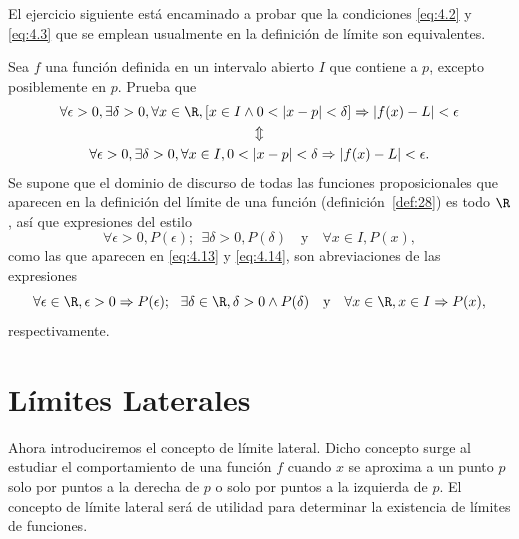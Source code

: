 \documentclass[12pt,a4paper]{book}
\begin{document}
    El ejercicio siguiente está encaminado a probar que la condiciones \eqref{eq:4.2} y
    \eqref{eq:4.3} que se emplean usualmente en la definición de límite son equivalentes.

    \begin{ejercicio}\label{ej:152}
        Sea $f$ una función definida en un intervalo abierto $I$ que
        contiene a $p$, excepto posiblemente en $p$. Prueba que
        \begin{gather}
            \forall\epsilon>0,\exists\delta>0,\forall x\in\R,[x\in I\wedge 0<|x-p|<\delta]\Rightarrow|f(x)-L|<\epsilon\label{eq:4.13}\\
            \Updownarrow\notag\\
            \forall\epsilon>0,\exists\delta>0,\forall x\in I,0<|x-p|<\delta\Rightarrow|f(x)-L|<\epsilon.\label{eq:4.14}
        \end{gather}
        \sugerencia Se supone que el dominio de discurso de todas las funciones
        proposicionales que aparecen en la definición del límite de una función
        (definición~\ref{def:28}) es todo $\R$, así que expresiones del estilo
        \begin{equation*}
            \forall\epsilon>0,P(\epsilon);\ \ \exists\delta>0,P(\delta)\quad\text{y}\quad\forall x\in I,P(x),
        \end{equation*}
        como las que aparecen en \eqref{eq:4.13} y \eqref{eq:4.14}, son abreviaciones de las expresiones
        \begin{equation*}
            \forall\epsilon\in\R,\epsilon>0\Rightarrow P(\epsilon);\ \ \exists\delta\in\R,\delta>0\wedge P(\delta)\quad\text{y}\quad\forall x\in\R,x\in I\Rightarrow P(x),
        \end{equation*}
        respectivamente.
    \end{ejercicio}

    \section{Límites Laterales}

    Ahora introduciremos el concepto de límite lateral. Dicho concepto surge
    al estudiar el comportamiento de una función $f$ cuando $x$ se aproxima a un
    punto $p$ solo por puntos a la derecha de $p$ o solo por puntos a la izquierda de
    $p$. El concepto de límite lateral será de utilidad para determinar la existencia
    de límites de funciones.
\end{document}
